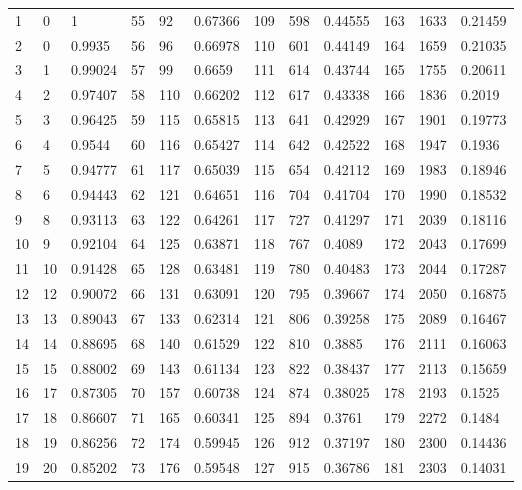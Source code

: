 \documentclass[12pt]{elegantbook}
\begin{document}
\begin{exercise*}[3]
{\begin{longtable}[c]{lll|lll|lll|lll}
    1   & 0    & 1        & 55  & 92   & 0.67366  & 109 & 598  & 0.44555  & 163 & 1633 & 0.21459  \\
    2   & 0    & 0.9935   & 56  & 96   & 0.66978  & 110 & 601  & 0.44149  & 164 & 1659 & 0.21035  \\
    3   & 1    & 0.99024  & 57  & 99   & 0.6659   & 111 & 614  & 0.43744  & 165 & 1755 & 0.20611  \\
    4   & 2    & 0.97407  & 58  & 110  & 0.66202  & 112 & 617  & 0.43338  & 166 & 1836 & 0.2019   \\
    5   & 3    & 0.96425  & 59  & 115  & 0.65815  & 113 & 641  & 0.42929  & 167 & 1901 & 0.19773  \\
    6   & 4    & 0.9544   & 60  & 116  & 0.65427  & 114 & 642  & 0.42522  & 168 & 1947 & 0.1936   \\
    7   & 5    & 0.94777  & 61  & 117  & 0.65039  & 115 & 654  & 0.42112  & 169 & 1983 & 0.18946  \\
    8   & 6    & 0.94443  & 62  & 121  & 0.64651  & 116 & 704  & 0.41704  & 170 & 1990 & 0.18532  \\
    9   & 8    & 0.93113  & 63  & 122  & 0.64261  & 117 & 727  & 0.41297  & 171 & 2039 & 0.18116  \\
    10  & 9    & 0.92104  & 64  & 125  & 0.63871  & 118 & 767  & 0.4089   & 172 & 2043 & 0.17699  \\
    11  & 10   & 0.91428  & 65  & 128  & 0.63481  & 119 & 780  & 0.40483  & 173 & 2044 & 0.17287  \\
    12  & 12   & 0.90072  & 66  & 131  & 0.63091  & 120 & 795  & 0.39667  & 174 & 2050 & 0.16875  \\
    13  & 13   & 0.89043  & 67  & 133  & 0.62314  & 121 & 806  & 0.39258  & 175 & 2089 & 0.16467  \\
    14  & 14   & 0.88695  & 68  & 140  & 0.61529  & 122 & 810  & 0.3885   & 176 & 2111 & 0.16063  \\
    15  & 15   & 0.88002  & 69  & 143  & 0.61134  & 123 & 822  & 0.38437  & 177 & 2113 & 0.15659  \\
    16  & 17   & 0.87305  & 70  & 157  & 0.60738  & 124 & 874  & 0.38025  & 178 & 2193 & 0.1525   \\
    17  & 18   & 0.86607  & 71  & 165  & 0.60341  & 125 & 894  & 0.3761   & 179 & 2272 & 0.1484   \\
    18  & 19   & 0.86256  & 72  & 174  & 0.59945  & 126 & 912  & 0.37197  & 180 & 2300 & 0.14436  \\
    19  & 20   & 0.85202  & 73  & 176  & 0.59548  & 127 & 915  & 0.36786  & 181 & 2303 & 0.14031  \\

\end{longtable}}
\end{exercise*}
\end{document}
